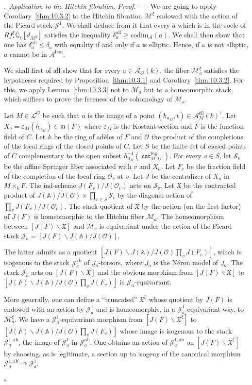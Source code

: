 \documentclass[12pt,a4paper,oneside,english,leqno]{smfart}
\makeatletter
\numberwithin{equation}{subsection}
\numberwithin{theo}{subsection}
\newenvironment{paragr}[1][]{\medskip\refstepcounter{subsection}%
  \par\noindent\hspace*{\parindent}\thesubsection.\ \emph{#1}%
  \@ifundefined{@empty}{}{}\ignorespaces}{\medskip}
\theoremstyle{plain}
\theoremstyle{definition}
\theoremstyle{remark}
\newenvironment{preuve}[1][]{\medskip\noindent\textit{Proof.} #1 ---\ }%
  {\hfill\ensuremath{\square}\medskip}
\DeclareMathOperator{\reg}{reg}
\DeclareMathOperator{\el}{ell}
\DeclareMathOperator{\car}{\mathfrak{car}}
\newcommand{\AAA}{\mathbb{A}}
\newcommand{\Qlb}{\overline{\mathbb{Q}}_{\ell}}
\newcommand{\oc}{\mathcal{O}}
\newcommand{\Sc}{\mathcal{S}}
\newcommand{\mc}{\mathcal{M}}
\newcommand{\lc}{\mathcal{L}}
\newcommand{\Ac}{\mathcal{A}}
\newcommand{\Jc}{\mathcal{J}}
\newcommand{\mgo}{\mathfrak{m}}
\newcommand{\Xgo}{\mathfrak{X}}
\newcommand{\back}{\backslash}
\newcommand{\eps}{\varepsilon}
\renewcommand{\leq}{\leqslant}
\renewcommand{\geq}{\geqslant}
\makeatother
\begin{document}
\begin{paragr}[Application to the Hitchin fibration.]
\begin{preuve}
We are going to apply Corollary~\ref{thm:10.3.2} to the Hitchin fibration $\mc^\xi$ endowed with the action of the Picard stack $\Jc^1$. We shall deduce from it that every $a$ which is in the socle of $Rf^\xi_*\Qlb[d_{\mc^\xi}]$ satisfies the inequality $\delta_a^{\mathrm{aff}}\geq\mathrm{codim}_\Ac(a)$. We shall then show that one has $\delta_a^{\mathrm{aff}}\leq\delta_a$ with equality if and only if $a$ is elliptic. Hence, if $a$ is not elliptic, $a$ cannot be in $\Ac^{\mathrm{bon}}$.

We shall first of all show that for every $a\in\Ac_G(k)$, the fiber $\mc_a^\xi$ satisfies the hypotheses required by Proposition~\ref{thm:10.3.1} and Corollary~\ref{thm:10.3.2}. For this, we apply Lemma~\ref{thm:10.3.3} not to $\mc_a$ but to a homeomorphic stack, which suffices to prove the freeness of the cohomology of $\mc_a$.

Let $M\in\lc^G$ be such that $a$ is the image of a point $(h_{a_M},t)\in\Ac_M^{\el}(k)^\tau$. Let $X_a = \eps_M(h_{a_M})\in\mgo(F)$ where $\eps_M$ is the Kostant section and $F$ is the function field of $C$. Let $\AAA$ be the ring of adèles of $F$ and $\oc$ the product of the completions of the local rings of the closed points of $C$. Let $S$ be the finite set of closed points of $C$ complementary to the open subset $h_{a_M}^{-1}(\car_{M,D}^{\reg})$. For every $v\in S$, let $\Sc_v$ be the affine Springer fiber associated with $v$ and $X_a$. Let $F_v$ be the fraction field of the completion of the local ring $\oc_v$ at $v$. Let $J$ be the centralizer of $X_a$ in $M\times_k F$. The ind-scheme $J(F_v)/J(\oc_v)$ acts on $\Sc_v$. Let $\Xgo$ be the contracted product of $J(\AAA)/J(\oc)\times\prod_{v\in S}\Sc_v$ by the diagonal action of $\prod_v J(F_v)/J(\oc_v)$. The stack quotient of $\Xgo$ by the action (on the first factor) of $J(F)$ is homeomorphic to the Hitchin fiber $\mc_a$. The homeomorphism between $[J(F)\back\Xgo]$ and $\mc_a$ is equivariant under the action of the Picard stack $\Jc_a = [J(F)\back J(\AAA)/J(\oc)]$.

The latter admits as a quotient $[J(F)\back J(\AAA)/J(\oc)\prod_v J(F_v)]$, which is isogenous to the stack $\Jc_a^{\mathrm{ab}}$ of $\tilde{J}_a$-torsors, where $\tilde{J}_a$ is the Néron model of $J_a$. The stack $\Jc_a$ acts on $[J(F)\back\Xgo]$ and the obvious morphism from $[J(F)\back\Xgo]$ to $[J(F)\back J(\AAA)/J(\oc)\prod_v J(F_v)]$ is $\Jc_a$-equivariant.

More generally, one can define a ``truncated'' $\Xgo^\xi$ whose quotient by $J(F)$ is endowed with an action by $\Jc_a^1$ and is homeomorphic, in a $\Jc_a^1$-equivariant way, to $\mc_a^\xi$. We have a $\Jc_a^1$-equivariant morphism from $[J(F)\back\Xgo^\xi]$ to $[J(F)\back J(\AAA)/J(\oc)\prod_v J(F_v)]$ whose image is isogenous to the stack $\Jc_a^{1,\mathrm{ab}}$, the image of $\Jc_a^1$ in $\Jc_a^{\mathrm{ab}}$. One obtains an action of $\Jc_a^{1,\mathrm{ab}}$ on $[J(F)\back\Xgo^\xi]$ by choosing, as is legitimate, a section up to isogeny of the canonical morphism $\Jc_a^{1,\mathrm{ab}}\to\Jc_a^1$.


\end{preuve}
\end{paragr}
\end{document}
